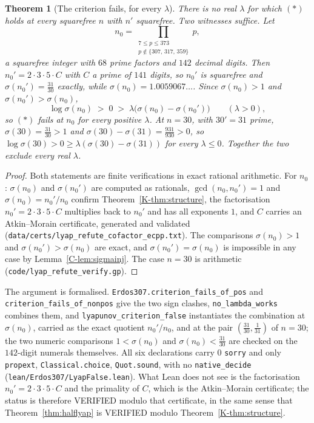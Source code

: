 \documentclass[11pt]{article}
\newtheorem{theorem}{Theorem}[section]
\theoremstyle{definition}
\begin{document}
\begin{theorem}[The criterion fails, for every $\lambda$]\label{thm:lyapfalse}
There is no real $\lambda$ for which $(\ast)$ holds at every squarefree $n$ with $n'$ squarefree.
Two witnesses suffice. Let
\[ n_0=\!\!\!\prod_{\substack{7\le p\le373\\ p\notin\{307,\,317,\,359\}}}\!\!\!p, \]
a squarefree integer with $68$ prime factors and $142$ decimal digits. Then $n_0'=2\cdot3\cdot5\cdot C$
with $C$ a prime of $141$ digits, so $n_0'$ is squarefree and $\sigma(n_0')=\tfrac{31}{30}$ exactly,
while $\sigma(n_0)=1.0059067\ldots$. Since $\sigma(n_0)>1$ and $\sigma(n_0')>\sigma(n_0)$,
\[ \log\sigma(n_0)\;>\;0\;>\;\lambda\bigl(\sigma(n_0)-\sigma(n_0')\bigr)\qquad(\lambda>0), \]
so $(\ast)$ fails at $n_0$ for every positive $\lambda$. At $n=30$, with $30'=31$ prime,
$\sigma(30)=\tfrac{31}{30}>1$ and $\sigma(30)-\sigma(31)=\tfrac{931}{930}>0$, so $\log\sigma(30)>0\ge
\lambda(\sigma(30)-\sigma(31))$ for every $\lambda\le0$. Together the two exclude every real
$\lambda$.
\end{theorem}
\begin{proof}
Both statements are finite verifications in exact rational arithmetic. For $n_0$: $\sigma(n_0)$ and
$\sigma(n_0')$ are computed as rationals, $\gcd(n_0,n_0')=1$ and $\sigma(n_0)=n_0'/n_0$ confirm
Theorem~\ref{K-thm:structure}, the factorisation $n_0'=2\cdot3\cdot5\cdot C$ multiplies back to $n_0'$
and has all exponents $1$, and $C$ carries an Atkin--Morain certificate, generated and validated
\textup{(\texttt{data/certs/lyap\_refute\_cofactor\_ecpp.txt})}. The comparisons $\sigma(n_0)>1$ and
$\sigma(n_0')>\sigma(n_0)$ are exact, and $\sigma(n_0')=\sigma(n_0)$ is impossible in any case by
Lemma~\ref{C-lem:sigmainj}. The case $n=30$ is arithmetic
\textup{(\texttt{code/lyap\_refute\_verify.gp})}.
\end{proof}

The argument is formalised. \texttt{Erdos307.criterion\_fails\_of\_pos} and
\texttt{criterion\_fails\_of\_nonpos} give the two sign clashes,
\texttt{no\_lambda\_works} combines them, and \texttt{lyapunov\_criterion\_false} instantiates the
combination at $\sigma(n_0)$, carried as the exact quotient $n_0'/n_0$, and at the pair
$(\tfrac{31}{30},\tfrac1{31})$ of $n=30$; the two numeric comparisons $1<\sigma(n_0)$ and
$\sigma(n_0)<\tfrac{31}{30}$ are checked on the $142$-digit numerals themselves. All six
declarations carry $0$ \texttt{sorry} and only \texttt{propext}, \texttt{Classical.choice},
\texttt{Quot.sound}, with no \texttt{native\_decide}
\textup{(\texttt{lean/Erdos307/LyapFalse.lean})}. What Lean does not see is the factorisation
$n_0'=2\cdot3\cdot5\cdot C$ and the primality of $C$, which is the Atkin--Morain certificate; the
status is therefore \textup{VERIFIED} modulo that certificate, in the same sense that
Theorem~\ref{thm:halflyap} is \textup{VERIFIED} modulo Theorem~\ref{K-thm:structure}.
\end{document}
